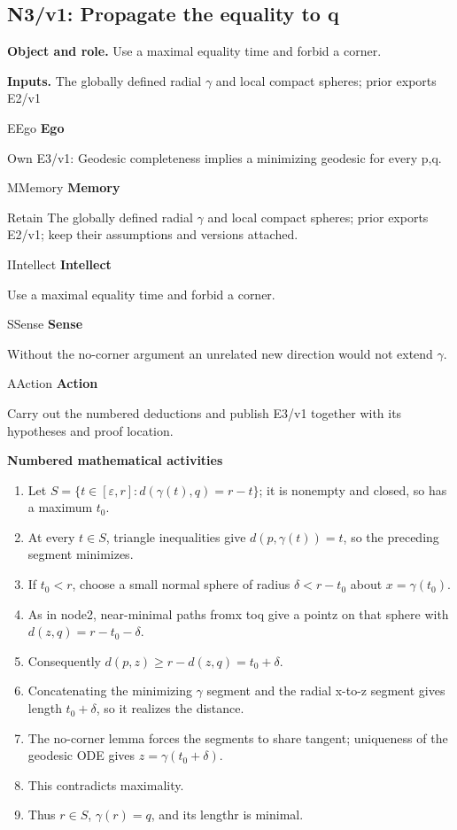 \documentclass[preprint,12pt,aps,pra,showkeys,amsmath,amssymb,superscriptaddress,floatfix]{revtex4-2}
\theoremstyle{definition}
\theoremstyle{remark}
\newcommand{\mmfaculty}[3]{%
 \begin{mmfacultybox}{#1}{#2}
 {\sffamily\bfseries\color{MMBlue}#2}\par\smallskip #3
 \end{mmfacultybox}}
\newcommand{\field}[2]{\par\smallskip\noindent\textbf{#1.} #2\par}
\begin{document}
\clearpage

\subsection{N3/v1: Propagate the equality to q}

\field{Object and role}{Use a maximal equality time and forbid a corner.}

\field{Inputs}{The globally defined radial \(\gamma\) and local compact spheres; prior
exports E2/v1}

\mmfaculty{E}{Ego}{Own E3/v1: Geodesic completeness implies a minimizing geodesic for every
p,q.}

\mmfaculty{M}{Memory}{Retain The globally defined radial \(\gamma\) and local compact spheres;
prior exports E2/v1; keep their assumptions and versions attached.}

\mmfaculty{I}{Intellect}{Use a maximal equality time and forbid a corner.}

\mmfaculty{S}{Sense}{Without the no-corner argument an unrelated new direction would not
extend \(\gamma\).}

\mmfaculty{A}{Action}{Carry out the numbered deductions and publish E3/v1 together with its
hypotheses and proof location.}

\smallskip\noindent\textbf{Numbered mathematical activities}

\begin{enumerate}[label=N3.\arabic*,leftmargin=3.4em]

\item Let \(S=\{t\in [\varepsilon ,r]:d(\gamma (t),q)=r-t\}\); it is nonempty
and closed, so has a maximum \(t_{0}\).

\item At every \(t\in S\), triangle inequalities give \(d(p,\gamma (t))=t\),
so the preceding segment minimizes.

\item If \(t_{0}<r\), choose a small normal sphere of radius
\(\delta <r-t_{0}\) about \(x=\gamma (t_{0})\).

\item As in node2, near-minimal paths fromx toq give a pointz on that sphere
with \(d(z,q)=r-t_{0}-\delta\).

\item Consequently \(d(p,z)\ge r-d(z,q)=t_{0}+\delta\).

\item Concatenating the minimizing \(\gamma\) segment and the radial x-to-z
segment gives length \(t_{0}+\delta\), so it realizes the distance.

\item The no-corner lemma forces the segments to share tangent; uniqueness of
the geodesic ODE gives \(z=\gamma (t_{0}+\delta )\).

\item This contradicts maximality.

\item Thus \(r\in S\), \(\gamma (r)=q\), and its lengthr is minimal.

\end{enumerate}
\end{document}
